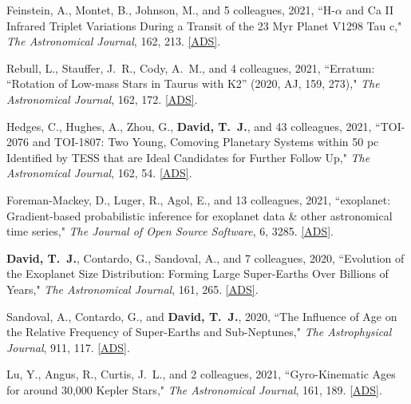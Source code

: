\item {{Feinstein}, A., {Montet}, B., {Johnson}, M., and 5 colleagues}, 2021, ``{H-$\alpha$ and Ca II Infrared Triplet Variations During a Transit of the 23 Myr Planet V1298 Tau c}," \textit{The Astronomical Journal}, 162, 213. \href{https://ui.adsabs.harvard.edu/abs/2021AJ....162..213F/abstract}{[ADS]}.

\item {{Rebull}, L., {Stauffer}, J.~R., {Cody}, A.~M., and 4 colleagues}, 2021, ``{Erratum: ``Rotation of Low-mass Stars in Taurus with K2'' (2020, AJ, 159, 273)}," \textit{The Astronomical Journal}, 162, 172. \href{https://ui.adsabs.harvard.edu/abs/2021AJ....162..172R/abstract}{[ADS]}.

\item {{Hedges}, C., {Hughes}, A., {Zhou}, G., {\bf {David}, T.~J.}, and 43 colleagues}, 2021, ``{TOI-2076 and TOI-1807: Two Young, Comoving Planetary Systems within 50 pc Identified by TESS that are Ideal Candidates for Further Follow Up}," \textit{The Astronomical Journal}, 162, 54. \href{https://ui.adsabs.harvard.edu/abs/2021AJ....162...54H}{[ADS]}.

\item {{Foreman-Mackey}, D., {Luger}, R., {Agol}, E., and 13 colleagues}, 2021, ``{exoplanet: Gradient-based probabilistic inference for exoplanet data \& other astronomical time series}," \textit{The Journal of Open Source Software}, 6, 3285. \href{https://ui.adsabs.harvard.edu/abs/2021JOSS....6.3285F}{[ADS]}.

\item {\bf {David}, T.~J.}, {Contardo}, G., {Sandoval}, A., and 7 colleagues, 2020, ``{Evolution of the Exoplanet Size Distribution: Forming Large Super-Earths Over Billions of Years}," \textit{The Astronomical Journal}, 161, 265. \href{https://ui.adsabs.harvard.edu/abs/2021AJ....161..265D/abstract}{[ADS]}.

\item {Sandoval}, A., {Contardo}, G., and {\bf {David}, T.~J.}, 2020, ``{The Influence of Age on the Relative Frequency of Super-Earths and Sub-Neptunes}," \textit{The Astrophysical Journal}, 911, 117. \href{https://ui.adsabs.harvard.edu/abs/2021ApJ...911..117S}{[ADS]}.

\item {Lu}, Y., {Angus}, R., {Curtis}, J.~L., and 2 colleagues, 2021, ``{Gyro-Kinematic Ages for around 30,000 Kepler Stars}," \textit{The Astronomical Journal}, 161, 189. \href{https://ui.adsabs.harvard.edu/abs/2021AJ....161..189L/abstract}{[ADS]}.

